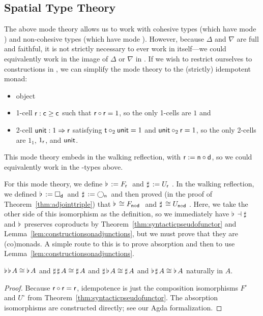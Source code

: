 \documentclass{drl-common/llncs}
\newcommand{\la}{\ensuremath{\dashv}}
\newcommand{\tc}[2]{\ensuremath{#1 \Rightarrow #2}}
\newcommand\compo[2]{\ensuremath{#1 \circ #2}}
\newcommand\comph[2]{\ensuremath{#1 \mathbin{\circ_2} #2}}
\newcommand\F[2]{\ensuremath{F_{#1} \,\, #2}}
\newcommand\U[2]{\ensuremath{U_{#1} \,\, #2}}
\newcommand\Bx[2]{\ensuremath{\Box_{#1} \, {#2}}}
\newcommand\Crc[2]{\ensuremath{\bigcirc_{#1} \, {#2}}}
\newcommand\Flat[1]{\ensuremath{\flat \, {#1}}}
\newcommand\Sharp[1]{\ensuremath{\sharp \, {#1}}}
\begin{document}
\subsection{Spatial Type Theory}

The above mode theory allows us to work with cohesive types (which have
mode ) and non-cohesive types (which have mode ).
However, because $\Delta$ and $\nabla$ are full and faithful, it is not
strictly necessary to ever work in  itself---we could
equivalently work in the image of $\Delta$ or $\nabla$ in .  If
we wish to restrict ourselves to constructions in , we can
simplify the mode theory to the (strictly) idempotent monad:
\begin{itemize}
\item object 
\item 1-cell $\mathsf{r} : \mathsf{c} \ge \mathsf{c}$ such that
  $\compo{\dsd{r}}{\dsd{r}} = 1$, so the only 1-cells are $1$ and 
\item 2-cell $\dsd{unit} : \tc{1}{\dsd{r}}$ satisfying $\comph{\dsd
  t}{\dsd{unit}} = 1$ and $\comph{\dsd{unit}}{\dsd{r}} = 1$, so 
  the only 2-cells are $1_1$, $1_{\mathsf{r}}$, and  $\mathsf{unit}$. 
\end{itemize}
This mode theory embeds in the walking reflection, with $\dsd{r} :=
\compo{\dsd{n}}{\dsd{d}}$, so we could equivalently work in the
-types above.

For this mode theory, we define $\Flat{} := \F{\dsd{r}}{}$ and $\Sharp{}
:= \U{\dsd{r}}{}$.  In the walking reflection, we defined $\Flat{} :=
\Bx{\dsd{d}}{}$ and $\Sharp{} := \Crc{\dsd{n}}{}$ and then proved (in
the proof of Theorem~\ref{thm:adjointtriple}) that $\Flat{} \iso
\F{\compo{\dsd n}{\dsd d}}$ and $\Sharp{} \iso \U{\compo{\dsd n}{\dsd
    d}}$. Here, we take the other side of this isomorphism as the
definition, so we immediately have $\Flat{} \la \Sharp{}$ and $\Flat{}$
preserves coproducts by Theorem~\ref{thm:syntacticpseudofunctor} and
Lemma~\ref{lem:constructionsonadjunctions}, but we must prove that they
are (co)monads.  A simple route to this is to prove
absorption and then to use Lemma~\ref{lem:constructionsonadjunctions}.  

\begin{theorem}
 $\Flat{\Flat A} \iso \Flat A$ and $\Sharp{\Sharp A} \iso \Sharp A$
and $\Sharp{\Flat A} \iso \Sharp{A}$ 
and $\Flat{\Sharp A} \iso \Flat{A}$ naturally in $A$.
\end{theorem}
\begin{proof}
Because $\compo{\dsd r}{\dsd r} = {\dsd r}$, idempotence is just the composition
isomorphisms $F^\circ$ and $U^\circ$ from
Theorem~\ref{thm:syntacticpseudofunctor}.  The absorption isomorphisms
are constructed directly; see our Agda formalization.
\end{proof}
\end{document}
